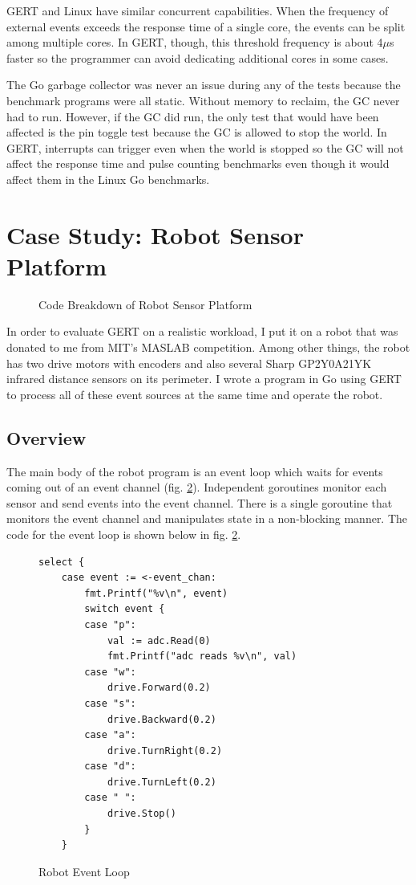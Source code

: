GERT and Linux have similar concurrent capabilities. When the frequency of external
events exceeds the response time of a single core, the events can be split among
multiple cores. In GERT, though, this threshold frequency is about 4$\mu$s faster
so the programmer can avoid dedicating additional cores in some cases.


The Go garbage collector was never an issue during any of the tests because the
benchmark programs were all static. Without memory to reclaim, the GC never
had to run. However, if the GC did run, the only test that would have been affected is
the pin toggle test because the GC is allowed to stop the world. In GERT, interrupts
can trigger even when the world is stopped so the GC will not affect the response time
and pulse counting benchmarks even though it would affect them in the Linux Go benchmarks.

\section{Case Study: Robot Sensor Platform} \label{sec:robot}

\begin{figure}[h]
  \begin{center}
 \end{center}
  \caption{Code Breakdown of Robot Sensor Platform} \label{fig:robot_code}
\end{figure}

In order to evaluate GERT on a realistic workload, I put it on a robot that was
donated to me from MIT's MASLAB competition. Among other things, the robot has two drive
motors with encoders and also several Sharp GP2Y0A21YK infrared distance sensors on its perimeter.
I wrote a program in Go using GERT to process all of these event sources at the same time
and operate the robot.

\subsection{Overview}
The main body of the robot program is an event loop which waits for events coming out of an event channel (fig. \ref{fig:event_loop}).
Independent goroutines monitor each sensor and send events into the event channel. There is a
single goroutine that monitors the event channel and manipulates state in a non-blocking manner. The code for the
event loop is shown below in fig. \ref{fig:event_loop}.

\begin{figure}[h]
  \begin{center}
\begin{lstlisting}
select {
	case event := <-event_chan:
		fmt.Printf("%v\n", event)
		switch event {
		case "p":
			val := adc.Read(0)
			fmt.Printf("adc reads %v\n", val)
		case "w":
			drive.Forward(0.2)
		case "s":
			drive.Backward(0.2)
		case "a":
			drive.TurnRight(0.2)
		case "d":
			drive.TurnLeft(0.2)
		case " ":
			drive.Stop()
		}
	}
\end{lstlisting}
\end{center}
  \caption{Robot Event Loop} \label{fig:event_loop}
\end{figure}

